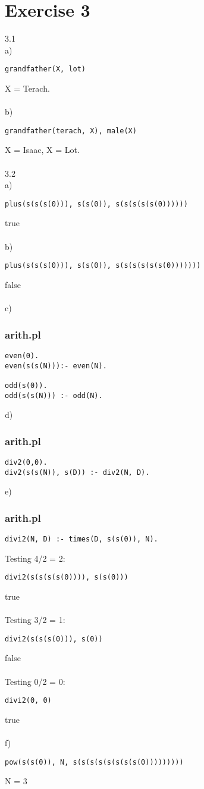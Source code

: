 \documentclass{article}
\begin{document}
\section*{Exercise 3}
3.1
\\
a)
\begin{lstlisting} 
grandfather(X, lot)
\end{lstlisting}
X = Terach.\\
\\
b)
\begin{lstlisting} 
grandfather(terach, X), male(X)
\end{lstlisting}
X = Isaac, X = Lot.\\
\\
3.2
\\
a)
\begin{lstlisting} 
plus(s(s(s(0))), s(s(0)), s(s(s(s(s(0))))))
\end{lstlisting}
true\\
\\
b)
\begin{lstlisting} 
plus(s(s(s(0))), s(s(0)), s(s(s(s(s(s(0)))))))
\end{lstlisting}
false\\
\\
c)
\subsubsection*{arith.pl}
\begin{lstlisting} 
even(0).
even(s(s(N))):- even(N).
    
odd(s(0)).
odd(s(s(N))) :- odd(N).
\end{lstlisting}
d)
\subsubsection*{arith.pl}
\begin{lstlisting} 
div2(0,0).
div2(s(s(N)), s(D)) :- div2(N, D).
\end{lstlisting}
e)
\subsubsection*{arith.pl}
\begin{lstlisting} 
divi2(N, D) :- times(D, s(s(0)), N).
\end{lstlisting}
Testing 4/2 = 2:
\begin{lstlisting} 
divi2(s(s(s(s(0)))), s(s(0)))
\end{lstlisting}
true
\\\\
Testing 3/2 = 1:
\begin{lstlisting} 
divi2(s(s(s(0))), s(0))
\end{lstlisting}
false
\\\\
Testing 0/2 = 0:
\begin{lstlisting} 
divi2(0, 0)
\end{lstlisting}
true\\
\\
f)
\begin{lstlisting} 
pow(s(s(0)), N, s(s(s(s(s(s(s(s(0)))))))))
\end{lstlisting}
N = 3
\end{document}
